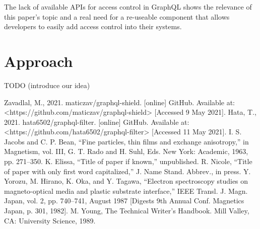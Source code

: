 \documentclass[conference]{IEEEtran}
\begin{document}
The lack of available APIs for access control in GraphQL shows the relevance of this paper's topic and a real need for a re-useable component that allows developers to easily add access control into their systems.

\section{Approach}\label{approach}

TODO (introduce our idea)

\begin{thebibliography}{00}
 Zavadlal, M., 2021. maticzav/graphql-shield. [online] GitHub. Available at: <https://github.com/maticzav/graphql-shield> [Accessed 9 May 2021].
 Hata, T., 2021. hata6502/graphql-filter. [online] GitHub. Available at: <https://github.com/hata6502/graphql-filter> [Accessed 11 May 2021].
 I. S. Jacobs and C. P. Bean, ``Fine particles, thin films and exchange anisotropy,'' in Magnetism, vol. III, G. T. Rado and H. Suhl, Eds. New York: Academic, 1963, pp. 271--350.
 K. Elissa, ``Title of paper if known,'' unpublished.
 R. Nicole, ``Title of paper with only first word capitalized,'' J. Name Stand. Abbrev., in press.
 Y. Yorozu, M. Hirano, K. Oka, and Y. Tagawa, ``Electron spectroscopy studies on magneto-optical media and plastic substrate interface,'' IEEE Transl. J. Magn. Japan, vol. 2, pp. 740--741, August 1987 [Digests 9th Annual Conf. Magnetics Japan, p. 301, 1982].
 M. Young, The Technical Writer's Handbook. Mill Valley, CA: University Science, 1989.
\end{thebibliography}
\end{document}
